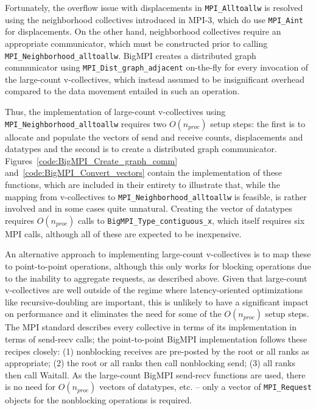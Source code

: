 Fortunately, the overflow issue with displacements in \texttt{MPI\_Alltoallw} is
resolved using the neighborhood collectives introduced in MPI-3, which do
use \texttt{MPI\_Aint} for displacements.
On the other hand, neighborhood collectives require an appropriate
communicator, which must be constructed prior to calling \texttt{MPI\_Neighborhood\_alltoallw}.
BigMPI creates a distributed graph communicator using \texttt{MPI\_Dist\_graph\_adjacent}
on-the-fly for every invocation of the large-count v-collectives, which instead assumed to be
insignificant overhead compared to the data movement entailed in such an operation.

Thus, the implementation of large-count v-collectives using \texttt{MPI\_Neighborhood\_alltoallw} 
requires two $O(n_{proc})$ setup steps: the first is to allocate and populate the vectors of 
send and receive counts, displacements and datatypes and 
the second is to create a distributed graph communicator.
Figures~\ref{code:BigMPI_Create_graph_comm} and~\ref{code:BigMPI_Convert_vectors}
contain the implementation of these functions, which are included in their entirety to illustrate that,
while the mapping from v-collectives to \texttt{MPI\_Neighborhood\_alltoallw} is feasible,
is rather involved and in some cases quite unnatural.
Creating the vector of datatypes requires $O(n_{proc})$ calls to \texttt{BigMPI\_Type\_contiguous\_x},
which itself requires six MPI calls, although all of these are expected to be inexpensive.


An alternative approach to implementing large-count v-collectives is to map
these to point-to-point operations, although this only works for blocking operations
due to the inability to aggregate requests, as described above.
Given that large-count v-collectives are well outside of the regime where latency-oriented 
optimizations like recursive-doubling are important, this is unlikely to have a significant impact 
on performance and it eliminates the need for some of the $O(n_{proc})$ setup steps.
The MPI standard describes every collective in terms of its implementation 
in terms of send-recv calls; the point-to-point BigMPI implementation 
follows these recipes closely:
(1) nonblocking receives are pre-posted by the root or all ranks as appropriate;
(2) the root or all ranks then call nonblocking send; 
(3) all ranks then call Waitall.
As the large-count BigMPI send-recv functions are used, there is no need for
$O(n_{proc})$ vectors of datatypes, etc. -- only a vector of \texttt{MPI\_Request}
objects for the nonblocking operations is required.


